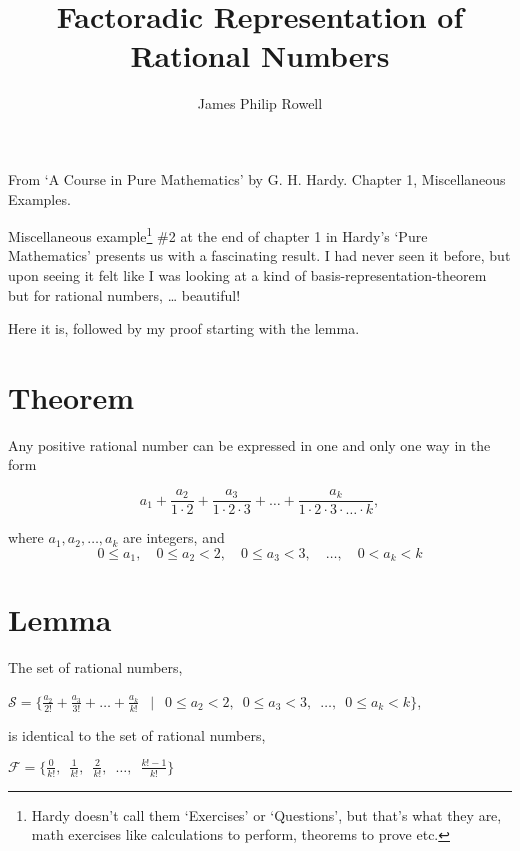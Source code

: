 \documentclass{article}
\author{James Philip Rowell}
\title{\vspace{-1.5cm}Factoradic Representation of Rational Numbers}
\date{} %
\begin{document}
\maketitle
\begin{em}
\centerline{\small{}From `A Course in Pure Mathematics' by G. H. Hardy. Chapter 1, Miscellaneous Examples.}
\end{em}
\bigskip

Miscellaneous example\footnote{Hardy doesn't call them `Exercises' or `Questions', but that's what they
are, math exercises like calculations to perform, theorems to prove etc.} \#2 at the end
of chapter 1 in Hardy's `Pure Mathematics'
presents us with a fascinating result.
I had never seen it before, but upon seeing it felt like I
was looking at a kind of basis-representation-theorem but for rational numbers, \dots{} beautiful!

Here it is, followed by my proof starting with the lemma.

\section*{Theorem}

Any positive rational number can be expressed in one and only one way in the form

\[a_1 + \frac{a_2}{1\cdot{}2}
+ \frac{a_3}{1\cdot{}2\cdot{}3}
+ \dots{}
+ \frac{a_k}{1\cdot{}2\cdot{}3\cdot{}\dots{}\cdot{}k},\]

where $a_1, a_2, \dots{}, a_k$ are integers, and
\[0\le{}a_1,\quad 0\le{}a_2<2,\quad 0\le{}a_3<3,\quad \dots{},\quad 0<a_k<k \]

\section*{Lemma}

The set of rational numbers,\newline

\centerline{$\mathcal{S} = \{\frac{a_2}{2!} + \frac{a_3}{3!} + \dots{} + \frac{a_k}{k!}\enspace\mid\enspace 
0\! \le{}\! a_2\! <\! 2,\enspace 
0\! \le{}\! a_3\! <\! 3,\enspace 
\dots{},\enspace 0\! \le{}\! a_k\! <\! k\}$,}
\bigskip
is identical to the set of rational numbers,\newline

\centerline{$\mathcal{F} = \{\frac{0}{k!},\enspace \frac{1}{k!},\enspace \frac{2}{k!},\enspace \dots{},\enspace \frac{k!-1}{k!}\}$}
\end{document}
